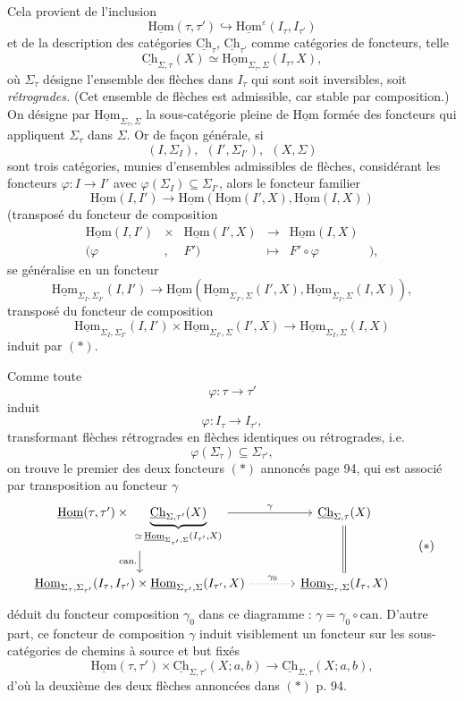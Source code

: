 \documentclass[11pt]{article}
\newcommand{\printedpage}[1]{\marginpar{\footnotesize p.~#1}}
\newcommand{\msp}[1]{\marginpar{\footnotesize [#1]}}
\newcommand{\uHom}{\underline{\mathrm{Hom}}}
\newcommand{\uCh}{\underline{\mathrm{Ch}}}
\begin{document}
Cela provient de l'inclusion
\[
\uHom(\tau,\tau')\hookrightarrow\uHom^{\varepsilon}(I_\tau,I_{\tau'})
\]
et de la description des catégories $\uCh_\tau$, $\uCh_{\tau'}$ comme catégories de foncteurs, telle
\[
\uCh_{\Sigma,\tau}(X)\simeq\uHom_{\Sigma_\tau,\Sigma}(I_\tau,X),
\]
où $\Sigma_\tau$ désigne l'ensemble des flèches dans $I_\tau$ qui sont soit inversibles, soit \textit{rétrogrades.} (Cet ensemble de flèches est admissible, car stable par composition.) On désigne par $\uHom_{\Sigma_\tau,\Sigma}$ la sous-catégorie pleine de $\uHom$ formée des foncteurs qui appliquent $\Sigma_\tau$ dans $\Sigma$. Or de façon générale, si
\[
(I,\Sigma_I),\ \ (I',\Sigma_{I'}),\ \ (X,\Sigma)
\]
sont trois catégories, munies d'ensembles admissibles de flèches, considérant les foncteurs $\varphi:I\longrightarrow I'$ avec $\varphi(\Sigma_I)\subseteq\Sigma_{I'}$, alors le foncteur familier
\[
\uHom(I,I')\longrightarrow\uHom(\uHom(I',X),\uHom(I,X))
\]
(transposé du foncteur de composition
\[
\begin{matrix}
\uHom(I,I') & \times & \uHom(I',X) & \longrightarrow & \uHom(I,X) & \\
(\varphi & , & F') & \longmapsto & F'\circ\varphi & ),
\end{matrix}
\]
se généralise en un foncteur
\[
\uHom_{\Sigma_I,\Sigma_{I'}}(I,I')\longrightarrow\uHom(\uHom_{\Sigma_{I'},\Sigma}(I',X),\uHom_{\Sigma_I,\Sigma}(I,X)),
\tag*{$(*)$}
\]
transposé du foncteur de composition
\[
\uHom_{\Sigma_I,\Sigma_{I'}}(I,I')\times\uHom_{\Sigma_{I'},\Sigma}(I',X)\longrightarrow\uHom_{\Sigma_I,\Sigma}(I,X)
\]
induit par $(*)$.

\msp{page 96}

Comme toute
\[
\varphi:\tau\longrightarrow\tau'
\]
induit
\[
\varphi:I_\tau\longrightarrow I_{\tau'},
\]
transformant flèches rétrogrades en flèches identiques ou rétrogrades, i.e.
\[
\varphi(\Sigma_\tau)\subseteq\Sigma_{\tau'},
\]
\printedpage{62}
on trouve le premier des deux foncteurs $(*)$ annoncés page 94, qui est associé par transposition au foncteur $\gamma$
\[
\begin{tikzcd}[column sep=large]
\uHom(\tau,\tau')\times\ \underbrace{\uCh_{\Sigma,\tau'}(X)}_{\simeq\,\uHom_{\Sigma_{\tau'},\Sigma}(I_{\tau'},X)} \arrow[r, "\gamma"] \arrow[d, "\text{can.}"'] & \uCh_{\Sigma,\tau}(X) \arrow[d, equal]\\
\uHom_{\Sigma_\tau,\Sigma_{\tau'}}(I_\tau,I_{\tau'})\times\uHom_{\Sigma_{\tau'},\Sigma}(I_{\tau'},X) \arrow[r, dotted, "\gamma_0"] & \uHom_{\Sigma_\tau,\Sigma}(I_\tau,X)
\end{tikzcd}
\tag*{$(*)$}
\]
déduit du foncteur composition $\gamma_0$ dans ce diagramme : $\gamma=\gamma_0\circ\mathrm{can}.$ D'autre part, ce foncteur de composition $\gamma$ induit visiblement un foncteur sur les sous-catégories de chemins à source et but fixés
\[
\uHom(\tau,\tau')\times\uCh_{\Sigma,\tau'}(X;a,b)\longrightarrow\uCh_{\Sigma,\tau}(X;a,b),
\]
d'où la deuxième des deux flèches annoncées dans $(*)$ p. 94.
\end{document}
